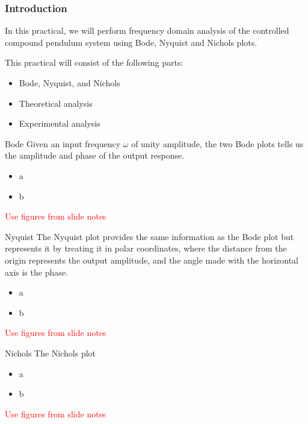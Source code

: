 \documentclass[9pt]{beamer-control}
\begin{document}

\begin{frame}
\frametitle{Introduction}
In this practical, we will perform frequency domain analysis of the controlled compound pendulum system using Bode, Nyquist and Nichols plots.

\vfill

This practical will consist of the following parts:
\begin{itemize}
\item Bode, Nyquist, and Nichols
\item Theoretical analysis
\item Experimental analysis
\end{itemize}
\end{frame}


\begin{frame}{Bode}
Given an input frequency $\omega$ of unity amplitude, the two Bode plots tells us the amplitude and phase of the output response.
\begin{itemize}
\item a
\item b
\end{itemize}
\textcolor{red}{Use figures from slide notes}
\end{frame}


\begin{frame}{Nyquist}
The Nyquist plot provides the same information as the Bode plot but represents it by treating it in polar coordinates, where the distance from the origin represents the output amplitude, and the angle made with the horizontal axis is the phase.
	\begin{itemize}
		\item a
		\item b
	\end{itemize}
\textcolor{red}{Use figures from slide notes}
\end{frame}

\begin{frame}{Nichols}
The Nichols plot 
	\begin{itemize}
		\item a
		\item b
	\end{itemize}
	\textcolor{red}{Use figures from slide notes}
\end{frame}
\end{document}
